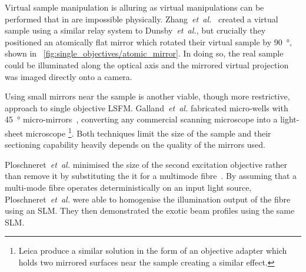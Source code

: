 Virtual sample manipulation is alluring as virtual manipulations can be performed that in are impossible physically.
Zhang~\emph{et~al.}~\cite{li_axial_2014} created a virtual sample using a similar relay system to Dunsby~\emph{et~al.}, but crucially they positioned an atomically flat mirror which rotated their virtual sample by \SI{90}{\degree}, shown in \figurename~\ref{fig:single_objectives/atomic_mirror}.
In doing so, the real sample could be illuminated along the optical axis and the mirrored virtual projection was imaged directly onto a camera. %

Using small mirrors near the sample is another viable, though more restrictive, approach to single objective \gls{LSFM}.
Galland~\emph{et~al.} fabricated micro-wells with \SI{45}{\degree} micro-mirrors~\cite{galland_3d_2015}, converting any commercial scanning microscope into a \gls{light-sheet} microscope
\footnote{Leica produce a similar solution in the form of an objective adapter which holds two mirrored surfaces near the sample creating a similar effect.}.
Both techniques limit the size of the sample and their sectioning capability heavily depends on the quality of the mirrors used.

Ploschneret~\emph{et~al.} minimised the size of the second excitation objective rather than remove it by substituting the it for a multimode fibre~\cite{ploschner_multimode_2015}.
By assuming that a multi-mode fibre operates deterministically on an input light source, Ploschneret~\emph{et~al.} were able to homogenise the illumination output of the fibre using an \gls{SLM}.
They then demonstrated the \gls{exotic beam} profiles using the same \gls{SLM}.

